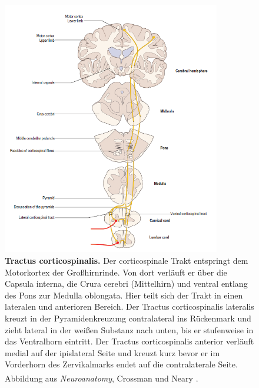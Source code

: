 \documentclass[12pt,a4paper,pdftex]{article}
\begin{document}
\begin{figure}[H]
    \centering
    \includegraphics[width=0.85\textwidth]{pictures/Bilder_Laura/corticospinal_tract.PNG}
    \caption[Tractus corticospinalis]{\textbf{Tractus corticospinalis.} Der corticospinale Trakt entspringt dem Motorkortex der Großhirnrinde. Von dort verläuft er über die Capsula interna, die Crura cerebri (Mittelhirn) und ventral entlang des Pons zur Medulla oblongata. Hier teilt sich der Trakt in einen lateralen und anterioren Bereich. Der Tractus corticospinalis lateralis kreuzt in der Pyramidenkreuzung contralateral ins Rückenmark und zieht lateral in der weißen Substanz nach unten, bis er stufenweise in das Ventralhorn eintritt. Der Tractus corticospinalis anterior verläuft medial auf der ipislateral Seite und kreuzt kurz bevor er im Vorderhorn des Zervikalmarks endet auf die contralaterale Seite. \\
    Abbildung aus \textit{Neuroanatomy}, Crossman und Neary \textsuperscript{\cite[8]{crossman2014neuroanatomy}}.}
    \label{fig:tr_corticospinalis}
\end{figure}
\end{document}
